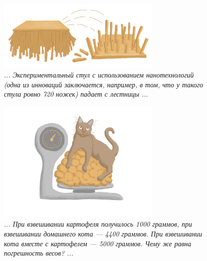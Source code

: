 \documentclass[10pt]{scrbook} \usepackage{modules/nonstahp_book}
\begin{document}
\begin{figure} \begin{center}
	\includegraphics[width=8cm]{figures/color/01c}
	\caption{
             {\itshape ... Экспериментальный стул с использованием нанотехнологий 
             (одна из инноваций заключается, например, в том, что у 
             такого стула ровно 720 ножек) падает с лестницы ...}\\
             }
\end{center} \end{figure}

\begin{figure} \begin{center}
	\includegraphics[width=8cm]{figures/color/02}
	\caption{
             {\itshape ... При взвешивании картофеля получилось 1000 граммов, при 
             взвешивании домашнего кота — 4400 граммов. При взвешивании кота вместе 
             с картофелем --- 5000 граммов. Чему же равна погрешность весов? ...}\\
             }
\end{center} \end{figure}
\end{document}
